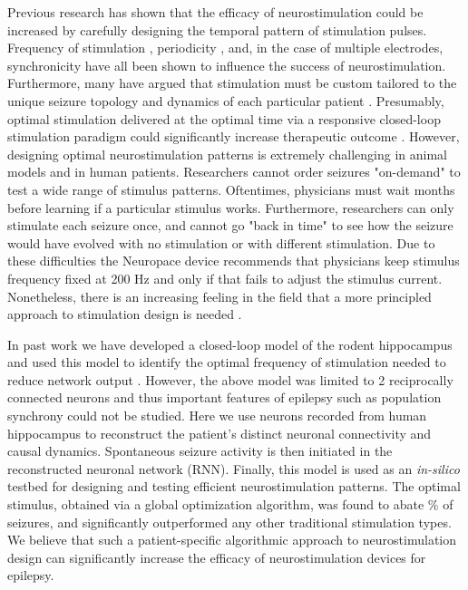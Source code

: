 \documentclass[11pt,a4paper,final]{article}
\begin{document}
Previous research has shown that the efficacy of neurostimulation could be increased by carefully designing the temporal pattern of stimulation pulses.
Frequency of stimulation \citep{chkhenkeli97,cordeiro13}, periodicity \autocite{wyckhuys10,buffel14}, and, in the case of multiple electrodes, synchronicity \citep{good09, nelson11,van14} have all been shown to influence the success of neurostimulation.
Furthermore, many have argued that stimulation must be custom tailored to the unique seizure topology and dynamics of each particular patient \citep{holt14,wendling13, taylor15}.
Presumably, optimal stimulation delivered at the optimal time via a responsive closed-loop stimulation paradigm could significantly increase therapeutic outcome \citep{chakravarthy2009controlling, chakravarthy2007controlling}.
However, designing optimal neurostimulation patterns is extremely challenging in animal models and in human patients.
Researchers cannot order seizures "on-demand" to test a wide range of stimulus patterns.
Oftentimes, physicians must wait months before learning if a particular stimulus works.
Furthermore, researchers can only stimulate each seizure once, and cannot go "back in time" to see how the seizure would have evolved with no stimulation or with different stimulation.
Due to these difficulties the Neuropace device recommends that physicians keep stimulus frequency fixed at 200 Hz and only if that fails to adjust the stimulus current.
Nonetheless, there is an increasing feeling in the field that a more principled approach to stimulation design is needed \citep{netoff15}.

In past work we have developed a closed-loop model of the rodent hippocampus and used this model to identify the optimal frequency of stimulation needed to reduce network output \citep{sandler15clpp}.
However, the above model was limited to 2 reciprocally connected neurons and thus important features of epilepsy such as population synchrony could not be studied.
Here we use \nn{} neurons recorded from human hippocampus to reconstruct the patient's distinct neuronal connectivity and causal dynamics.
Spontaneous seizure activity is then initiated in the reconstructed neuronal network (RNN).
Finally, this model is used as an \textit{in-silico} testbed for designing and testing efficient neurostimulation patterns.
The optimal stimulus, obtained via a global optimization algorithm, was found to abate \success{}\% of seizures, and significantly outperformed any other traditional stimulation types.
We believe that such a patient-specific algorithmic approach to neurostimulation design can significantly increase the efficacy of neurostimulation devices for epilepsy.
\end{document}

